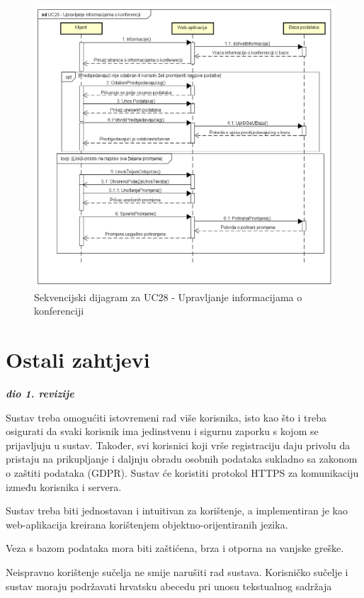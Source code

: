 				\begin{figure}[H]
					\includegraphics[scale=0.50]{dijagrami/UC28-UprInfoAdmin.png} 
					\centering
					\caption{Sekvencijski dijagram za UC28 - Upravljanje informacijama o konferenciji}
					\label{fig:sekvencijski4}
				\end{figure}

				\eject

	
		\section{Ostali zahtjevi}
		
			\textbf{\textit{dio 1. revizije}}\\
		 
			 \begin{packed_item}

				\item Sustav treba omogućiti istovremeni rad više korisnika, isto kao što i treba osigurati da svaki korisnik ima jedinstvenu i sigurnu zaporku s kojom se prijavljuju u sustav. Također, svi korisnici koji vrše registraciju daju privolu da pristaju na prikupljanje i daljnju obradu osobnih podataka sukladno sa zakonom o zaštiti podataka (GDPR). Sustav će koristiti protokol HTTPS za komunikaciju između korisnika i servera.
				\item Sustav treba biti jednostavan i intuitivan za korištenje, a implementiran je kao web-aplikacija kreirana korištenjem objektno-orijentiranih jezika.
				\item Veza s bazom podataka mora biti zaštićena, brza i otporna na vanjske greške.
				\item Neispravno korištenje sučelja ne smije narušiti rad sustava. Korisničko sučelje i sustav moraju podržavati hrvatsku abecedu pri unosu tekstualnog sadržaja

			\end{packed_item}
			 
			 
			 
	